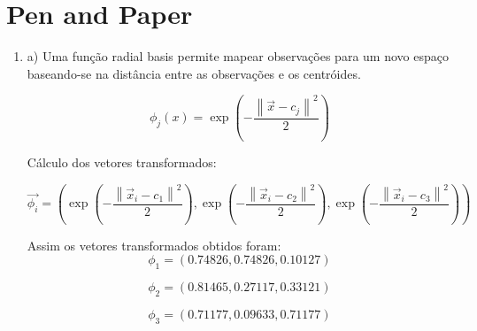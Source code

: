 \documentclass[a4paper,12pt]{article} %
\begin{document}
\section*{Pen and Paper}
\begin{enumerate}

\item 




a) Uma função radial basis permite mapear observações para um novo espaço 
baseando-se na distância entre as observações e os centróides.

\begin{equation}
    \phi_j (x) = \exp\left(-\frac{\left\|\vec{x}-c_j\right\|^2}{2}\right)
\end{equation}

Cálculo dos vetores transformados:

\begin{equation}
\vec{\phi_i} = \left( \exp\left(-\frac{\left\|\vec{x}_i-c_1\right\|^2}{2}\right)   , \exp\left(-\frac{\left\|\vec{x}_i-c_2\right\|^2}{2}\right)  , \exp\left(-\frac{\left\|\vec{x}_i-c_3\right\|^2}{2}\right)   \right)
\end{equation}

Assim os vetores transformados obtidos foram:
\begin{equation*}
    \phi_1 = (0.74826,0.74826,0.10127)
\end{equation*}

\begin{equation*}
    \phi_2 = (0.81465,0.27117,0.33121)
\end{equation*}

\begin{equation*}
    \phi_3 = (0.71177,0.09633,0.71177)
\end{equation*}


\end{enumerate}
\end{document}
